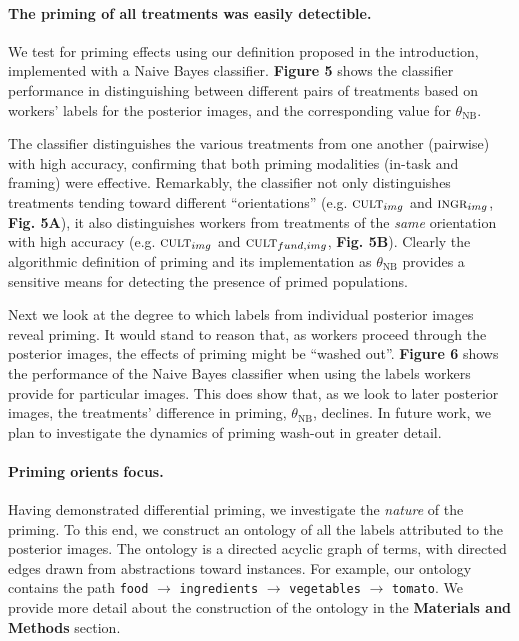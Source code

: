 \documentclass[a4paper]{report}
\begin{document}
\paragraph{The priming of all treatments was easily detectible.}
We test for priming effects using our definition proposed in the introduction,
implemented with a Naive Bayes classifier.  \textbf{Figure 5} shows
the classifier performance in distinguishing between different pairs of 
treatments based on workers' labels for the posterior images, and the corresponding
value for $\theta_\text{NB}$.

The classifier distinguishes the various treatments from one another (pairwise)
with high accuracy, confirming that both priming modalities 
(in-task and framing) were effective.  Remarkably, the classifier not only 
distinguishes treatments tending toward different ``orientations'' 
(e.g. $\textsc{cult}_{img}$ and $\textsc{ingr}_{img}$, \textbf{Fig. 5A}), 
it also distinguishes workers from treatments of the \textit{same} 
orientation with high accuracy 
(e.g. $\textsc{cult}_{img}$ and $\textsc{cult}_{fund, img}$, \textbf{Fig. 5B}).
Clearly the algorithmic definition of priming and its implementation as 
$\theta_\text{NB}$ provides a sensitive means for detecting the presence of
primed populations. 

Next we look at the degree to which labels from individual posterior images reveal 
priming.  It would stand to reason that, as workers proceed through 
the posterior images, the effects of priming might be ``washed out''.  
\textbf{Figure 6} shows the
performance of the Naive Bayes classifier when using the labels workers provide
for particular images.  This does show that, as we look to later posterior images, 
the treatments' difference in priming, $\theta_\text{NB}$, declines.  In future
work, we plan to investigate the dynamics of priming wash-out in greater 
detail.

\paragraph{Priming orients focus.} Having demonstrated differential 
priming, we investigate the \textit{nature} of the priming.  To this
end, we construct an ontology of all the labels attributed to
the posterior images.  The ontology is a directed acyclic graph of terms,
with directed edges drawn from abstractions toward instances.  For example,
our ontology contains the path \texttt{food} $\to$ \texttt{ingredients} $\to$ 
\texttt{vegetables} 
$\to$ \texttt{tomato}. We provide more detail about the construction of the 
ontology in the \textbf{Materials and Methods} section.
\end{document}
